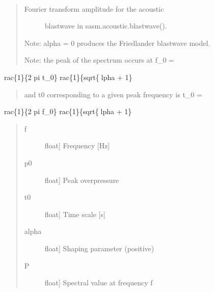 \documentclass[letterpaper,10pt,english]{sphinxmanual}
\begin{document}

\begin{fulllineitems}
\label{\detokenize{infrapy.characterization:infrapy.characterization.spye.blastwave_spectrum}}~\begin{quote}
\begin{description}
\item[{Fourier transform amplitude for the acoustic}] \leavevmode
blastwave in sasm.acoustic.blastwave().

\end{description}

Note: alpha = 0 produces the Friedlander
blastwave model.

Note: the peak of the spectrum occurs at
f\_0 =
\end{quote}

rac\{1\}\{2 pi t\_0\} 
rac\{1\}\{sqrt\{lpha + 1\}
\begin{quote}

and t0 corresponding to a given peak frequency is
t\_0 =
\end{quote}

rac\{1\}\{2 pi f\_0\} 
rac\{1\}\{sqrt\{lpha + 1\}
\begin{quote}
\begin{description}
\item[{f}] \leavevmode{[}float{]}
Frequency {[}Hz{]}

\item[{p0}] \leavevmode{[}float{]}
Peak overpressure

\item[{t0}] \leavevmode{[}float{]}
Time scale {[}s{]}

\item[{alpha}] \leavevmode{[}float{]}
Shaping parameter (positive)

\end{description}
\begin{description}
\item[{P}] \leavevmode{[}float{]}
Spectral value at frequency f

\end{description}
\end{quote}

\end{fulllineitems}
\end{document}
